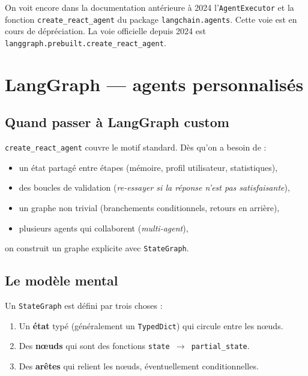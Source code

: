 \documentclass[11pt,a4paper]{article}
\begin{document}
\begin{info}
On voit encore dans la documentation antérieure à 2024 l'\texttt{AgentExecutor} et la fonction \texttt{create\_react\_agent} du package \texttt{langchain.agents}. Cette voie est en cours de dépréciation. La voie officielle depuis 2024 est \texttt{langgraph.prebuilt.create\_react\_agent}.
\end{info}

\section{LangGraph --- agents personnalisés}

\subsection{Quand passer à LangGraph custom}

\texttt{create\_react\_agent} couvre le motif standard. Dès qu'on a besoin de :
\begin{itemize}
  \item un état partagé entre étapes (mémoire, profil utilisateur, statistiques),
  \item des boucles de validation (\emph{re-essayer si la réponse n'est pas satisfaisante}),
  \item un graphe non trivial (branchements conditionnels, retours en arrière),
  \item plusieurs agents qui collaborent (\emph{multi-agent}),
\end{itemize}
\noindent on construit un graphe explicite avec \texttt{StateGraph}.

\subsection{Le modèle mental}

Un \texttt{StateGraph} est défini par trois choses :
\begin{enumerate}
  \item Un \textbf{état} typé (généralement un \texttt{TypedDict}) qui circule entre les n{\oe}uds.
  \item Des \textbf{n{\oe}uds} qui sont des fonctions \texttt{state $\rightarrow$ partial\_state}.
  \item Des \textbf{arêtes} qui relient les n{\oe}uds, éventuellement conditionnelles.
\end{enumerate}
\end{document}
